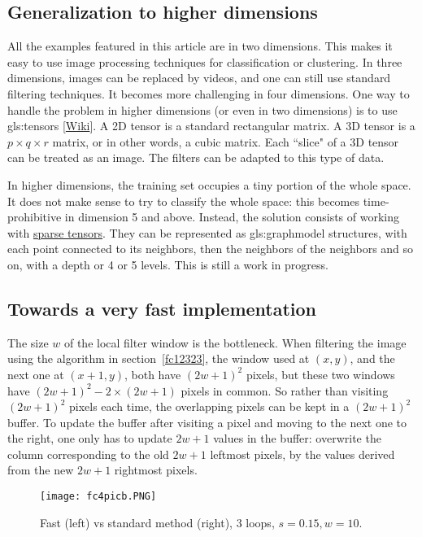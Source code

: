 \documentclass[oneside,10pt]{book}
\begin{document}
\subsection{Generalization to higher dimensions}

All the examples featured in this article are in two dimensions. This makes it easy to use image processing techniques for classification or clustering. In three dimensions, images can be replaced by videos, and one can still use standard filtering techniques. It becomes more challenging in four dimensions. One way to handle the problem in higher dimensions (or even in two dimensions) is to use \glspl{gls:tensor} [\href{https://en.wikipedia.org/wiki/Tensor}{Wiki}]. A 2D tensor is a standard rectangular matrix. A 3D tensor is a $p\times q\times r$ matrix, or in other words, a cubic matrix. Each ``slice" of a 3D tensor can be treated as an image. The filters can be adapted to this type of data.

In higher dimensions, the training set occupies a tiny portion of the whole space.  It does not make sense to try to classify the whole space: this becomes time-prohibitive in dimension 5 and above. Instead, the solution consists of working with \href{https://www.tensorflow.org/guide/sparse_tensor}{sparse tensors}. They can be represented as \gls{gls:graphmodel} structures, with each point connected to its neighbors, then the neighbors of the neighbors and so on, with a depth or 4 or 5 levels. This is still a work in progress.

\subsection{Towards a very fast implementation}\label{fctav}

 The size $w$ of the local filter window is the bottleneck.
When filtering the image using the algorithm in section~\ref{fc12323}, the window used at $(x,y)$, and the next one at $(x+1,y)$, both have $(2w+1)^2$ pixels, but these two windows have $(2w+1)^2 - 2\times (2w+1)$ pixels in common. So rather than visiting $(2w+1)^2$ pixels each time, the overlapping pixels can be kept in a $(2w+1)^2$ buffer. To update the buffer after visiting a pixel and moving to the next one to the right, one only has to update $2w+1$ values in the buffer: overwrite the column corresponding to the old $2w+1$ leftmost pixels, by the values derived from the new $2w+1$ rightmost pixels.

\begin{figure}[H]
\centering
\texttt{[image: fc4picb.PNG]}
\caption{Fast (left) vs standard method (right), $3$ loops, $s=0.15, w=10$.}
\label{fc4picb}
\end{figure}
\end{document}
